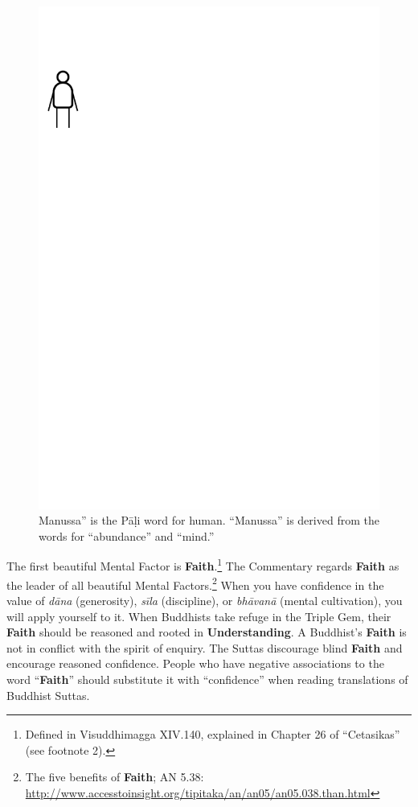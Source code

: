 \begin{figure}[h]
\centering
\includegraphics[width=1.0\linewidth]{./Diagrams/Key}
\caption{Manussa” is the Pāḷi word for human. “Manussa” is derived from the words for “abundance” and “mind.”}
\label{fig:Key}
\end{figure}

The first beautiful Mental Factor is \textbf{Faith}.\footnote{Defined in Visuddhimagga XIV.140, explained in Chapter 26 of “Cetasikas” (see footnote 2).} The Commentary regards \textbf{Faith} as the leader of all beautiful Mental Factors.\footnote{The five benefits of \textbf{Faith}; AN 5.38: \url{http://www.accesstoinsight.org/tipitaka/an/an05/an05.038.than.html}} When you have confidence in the value of \textit{dāna} (generosity), \textit{sīla} (discipline), or \textit{bhāvanā} (mental cultivation), you will apply yourself to it. When Buddhists take refuge in the Triple Gem, their \textbf{Faith} should be reasoned and rooted in \textbf{Understanding}. A Buddhist’s \textbf{Faith} is not in conflict with the spirit of enquiry. The Suttas discourage blind \textbf{Faith} and encourage reasoned confidence. People who have negative associations to the word “\textbf{Faith}” should substitute it with “confidence” when reading translations of Buddhist Suttas.

